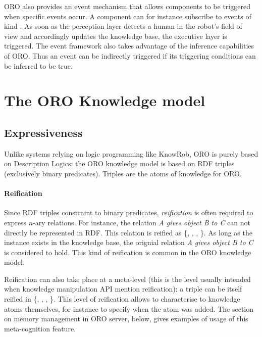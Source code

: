 ORO also provides an event mechanism that allows components to be triggered
when specific events occur. A component can for instance subscribe to events
of kind . As soon as the
perception layer detects a human in the robot's field of view and accordingly
updates the knowledge base, the executive layer is triggered. The event
framework also takes advantage of the inference capabilities of ORO. Thus an
event can be indirectly triggered if its triggering conditions can be
inferred to be true.




\section{The ORO Knowledge model}
\label{sect|knowledge-model}

\subsection{Expressiveness}

Unlike systems relying on logic programming like {\sc KnowRob}, ORO is purely
based on Description Logics: the ORO knowledge model is based on RDF triples
(\ie exclusively binary predicates). Triples 
are the atoms of knowledge for ORO.

\paragraph{Reification} Since RDF triples constraint to binary predicates,
\emph{reification} is often required to express $n$-ary relations. For
instance, the relation \emph{A gives object B to C} can not directly be
represented in RDF. This relation is reified as \{,
, , \}. As
long as the instance  exists in the knowledge base, the orignial
relation \emph{A gives object B to C} is considered to hold. This kind of
reification is common in the ORO knowledge model.

Reification can also take place at a meta-level (this is the level usually
intended when knowledge manipulation API mention reification): a triple
 can be itself reified in \{, , , \}. This level of reification allows
to characterise to knowledge atoms themselves, for instance to specify when the
atom was added. The section on memory management in ORO server, below, gives
examples of usage of this meta-cognition feature.

